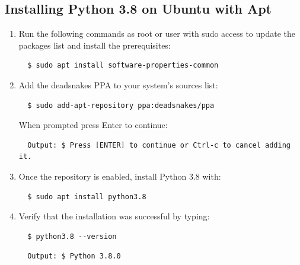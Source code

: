 \documentclass[a4paper, 12pt]{report}
\begin{document}
\subsection{Installing Python 3.8 on Ubuntu with Apt}
\begin{enumerate}
  \item Run the following commands as root or user with sudo access to update the packages list and install the prerequisites:
  \begin{verbatim}
  $ sudo apt install software-properties-common
  \end{verbatim}

  \item Add the deadsnakes PPA to your system’s sources list:
  \begin{verbatim}
  $ sudo add-apt-repository ppa:deadsnakes/ppa
  \end{verbatim}
  
  When prompted press Enter to continue:  
  \begin{verbatim}
  Output: $ Press [ENTER] to continue or Ctrl-c to cancel adding it.
  \end{verbatim}

  \item Once the repository is enabled, install Python 3.8 with:
  \begin{verbatim}
  $ sudo apt install python3.8
  \end{verbatim}

  \item Verify that the installation was successful by typing:
  \begin{verbatim}
  $ python3.8 --version
  \end{verbatim}
  \begin{verbatim}
  Output: $ Python 3.8.0
  \end{verbatim}
  
\end{enumerate}
\end{document}

